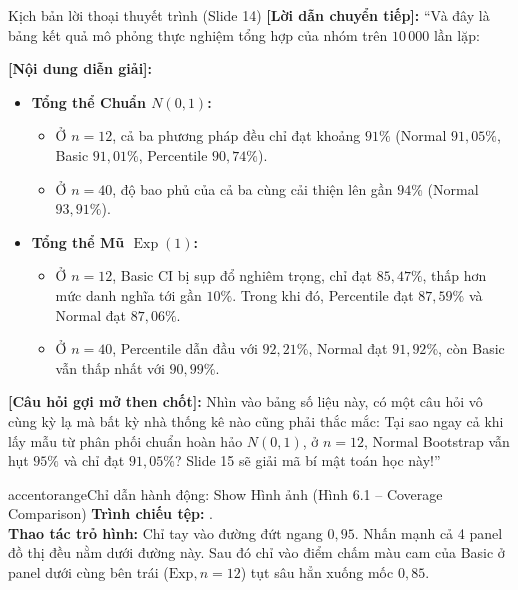 \documentclass[10pt,a4paper]{article}
\begin{document}
\begin{scriptbox}{Kịch bản lời thoại thuyết trình (Slide 14)}
    \textbf{[Lời dẫn chuyển tiếp]:} ``Và đây là bảng kết quả mô phỏng thực nghiệm tổng hợp của nhóm trên $10\,000$ lần lặp:
    
    \textbf{[Nội dung diễn giải]:} 
    \begin{itemize}
        \item \textbf{Tổng thể Chuẩn $N(0, 1)$:}
        \begin{itemize}
            \item Ở $n=12$, cả ba phương pháp đều chỉ đạt khoảng $91\%$ (Normal $91{,}05\%$, Basic $91{,}01\%$, Percentile $90{,}74\%$).
            \item Ở $n=40$, độ bao phủ của cả ba cùng cải thiện lên gần $94\%$ (Normal $93{,}91\%$).
        \end{itemize}
        \item \textbf{Tổng thể Mũ $\operatorname{Exp}(1)$:}
        \begin{itemize}
            \item Ở $n=12$, Basic CI bị sụp đổ nghiêm trọng, chỉ đạt \textbf{$85{,}47\%$}, thấp hơn mức danh nghĩa tới gần $10\%$. Trong khi đó, Percentile đạt $87{,}59\%$ và Normal đạt $87{,}06\%$.
            \item Ở $n=40$, Percentile dẫn đầu với $92{,}21\%$, Normal đạt $91{,}92\%$, còn Basic vẫn thấp nhất với $90{,}99\%$.
        \end{itemize}
    \end{itemize}
    \textbf{[Câu hỏi gợi mở then chốt]:} Nhìn vào bảng số liệu này, có một câu hỏi vô cùng kỳ lạ mà bất kỳ nhà thống kê nào cũng phải thắc mắc: Tại sao ngay cả khi lấy mẫu từ phân phối chuẩn hoàn hảo $N(0,1)$, ở $n=12$, Normal Bootstrap vẫn hụt $95\%$ và chỉ đạt $91{,}05\%$? Slide 15 sẽ giải mã bí mật toán học này!''
\end{scriptbox}

\begin{actionbox}{accentorange}{Chỉ dẫn hành động: Show Hình ảnh (Hình 6.1 -- Coverage Comparison)}
    \textbf{Trình chiếu tệp:} .\\
    \textbf{Thao tác trỏ hình:} Chỉ tay vào đường đứt ngang $0{,}95$. Nhấn mạnh cả 4 panel đồ thị đều nằm dưới đường này. Sau đó chỉ vào điểm chấm màu cam của Basic ở panel dưới cùng bên trái ($\text{Exp}, n=12$) tụt sâu hẳn xuống mốc $0{,}85$.
\end{actionbox}
\end{document}
